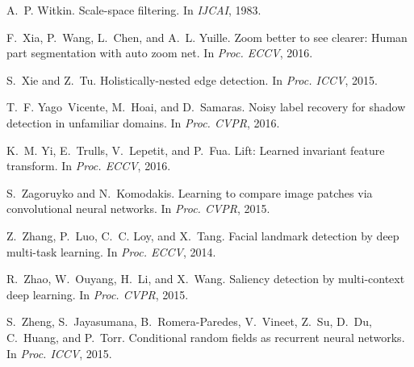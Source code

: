 \documentclass[10pt,twocolumn,letterpaper]{article}
\begin{document}
\begin{thebibliography}{100}
	A.~P. Witkin.
	\newblock Scale-space filtering.
	\newblock In {\em IJCAI}, 1983.
	
	F.~Xia, P.~Wang, L.~Chen, and A.~L. Yuille.
	\newblock Zoom better to see clearer: Human part segmentation with auto zoom
	net.
	\newblock In {\em Proc. {ECCV}}, 2016.
	
	S.~Xie and Z.~Tu.
	\newblock Holistically-nested edge detection.
	\newblock In {\em Proc. {ICCV}}, 2015.
	
	T.~F. Yago~Vicente, M.~Hoai, and D.~Samaras.
	\newblock Noisy label recovery for shadow detection in unfamiliar domains.
	\newblock In {\em Proc. {CVPR}}, 2016.
	
	K.~M. Yi, E.~Trulls, V.~Lepetit, and P.~Fua.
	\newblock Lift: Learned invariant feature transform.
	\newblock In {\em Proc. {ECCV}}, 2016.
	
	S.~Zagoruyko and N.~Komodakis.
	\newblock Learning to compare image patches via convolutional neural networks.
	\newblock In {\em Proc. {CVPR}}, 2015.
	
	Z.~Zhang, P.~Luo, C.~C. Loy, and X.~Tang.
	\newblock Facial landmark detection by deep multi-task learning.
	\newblock In {\em Proc. {ECCV}}, 2014.
	
	R.~Zhao, W.~Ouyang, H.~Li, and X.~Wang.
	\newblock Saliency detection by multi-context deep learning.
	\newblock In {\em Proc. {CVPR}}, 2015.
	
	S.~Zheng, S.~Jayasumana, B.~Romera-Paredes, V.~Vineet, Z.~Su, D.~Du, C.~Huang,
	and P.~Torr.
	\newblock Conditional random fields as recurrent neural networks.
	\newblock In {\em Proc. {ICCV}}, 2015.
	
\end{thebibliography}
\end{document}
